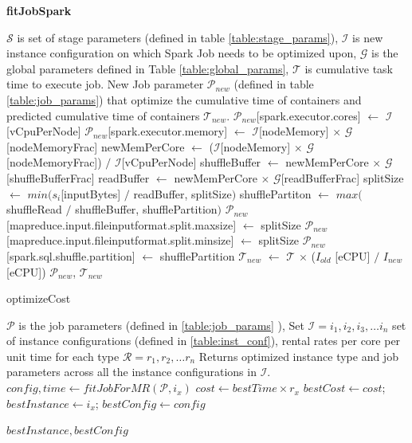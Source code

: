 \renewcommand{\algorithmicrequire}{\textbf{Input:}}
\renewcommand{\algorithmicensure}{\textbf{Output:}}
\renewcommand{\algorithmiccomment}[1]{// #1}
\begin{algorithm}
\caption{\textbf{fitJobSpark}}\label{jobfitspark}
\begin{algorithmic}[1]
\footnotesize
\REQUIRE  $\mathcal{S}$ is set of stage parameters (defined in table \ref{table:stage_params}), $\mathcal{I}$ is new instance configuration on which Spark Job needs to be optimized upon, $\mathcal{G}$ is the global parameters defined in Table \ref{table:global_params}, $\mathcal{T}$ is cumulative task time to execute job.
\ENSURE New Job parameter $\mathcal{P}_{new}$ (defined in table \ref{table:job_params}) that optimize the cumulative time of containers and predicted cumulative time of containers $\mathcal{T}_{new}$.
\STATE $\mathcal{P}_{new}$[spark.executor.cores] $\gets$ $\mathcal{I}$ [vCpuPerNode]
\STATE $\mathcal{P}_{new}$[spark.executor.memory] $\gets$ $\mathcal{I}$[nodeMemory] $\times$ $\mathcal{G}$[nodeMemoryFrac]
\STATE newMemPerCore $\gets$ ($\mathcal{I}$[nodeMemory] $\times$ $\mathcal{G}$[nodeMemoryFrac]) $/$ $\mathcal{I}$[vCpuPerNode]
\STATE shuffleBuffer $\gets$ newMemPerCore $\times$ $\mathcal{G}$[shuffleBufferFrac]
\STATE readBuffer $\gets$ newMemPerCore $\times$ $\mathcal{G}$[readBufferFrac]
\STATE splitSize $\gets$ $min(s_{i}$[inputBytes] $/$  readBuffer, splitSize$)$ 
\STATE shufflePartiton $\gets$ $max($shuffleRead $/$ shuffleBuffer, shufflePartition$)$
\ENDFOR
\STATE $\mathcal{P}_{new}$[mapreduce.input.fileinputformat.split.maxsize] $\gets$ splitSize
\STATE $\mathcal{P}_{new}$[mapreduce.input.fileinputformat.split.minsize] $\gets$ splitSize
\STATE $\mathcal{P}_{new}$[spark.sql.shuffle.partition] $\gets$ shufflePartition
\STATE $\mathcal{T}_{new}$ $\gets$ $\mathcal{T}$ $\times$ ($I_{old}$ [eCPU] $/$ $I_{new}$[eCPU])
\RETURN $\mathcal{P}_{new}$, $\mathcal{T}_{new}$
\end{algorithmic}
\end{algorithm}

\begin{algorithm}
\caption{optimizeCost} \label{cost_optimize}
\begin{algorithmic}[1]
\footnotesize
\REQUIRE $\mathcal{P}$ is the job parameters (defined in \ref{table:job_params} ), Set $\mathcal{I} = {i_1, i_2, i_3, \ldots i_n} $ set of instance configurations (defined in \ref{table:inst_conf}), rental rates per core per unit time for each type $\mathcal{R}={r_1, r_2, \ldots r_n}$
\ENSURE Returns optimized instance type and job parameters across all the instance configurations in $\mathcal{I}$.
	\STATE $config, time \gets fitJobForMR(\mathcal{P}, i_x)$
	\STATE $cost \gets  bestTime \times r_x$  
		\STATE $bestCost \gets cost$;
		$bestInstance \gets i_x$;
		$bestConfig \gets config$
	\ENDIF
\ENDFOR

\RETURN $bestInstance, bestConfig$
\end{algorithmic}
\end{algorithm}

